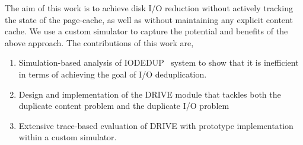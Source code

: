 The aim of this work is to achieve disk I/O reduction without actively 
tracking the state of the page-cache, as well as without maintaining any 
explicit content cache. 
We use a custom simulator to capture
the potential and benefits of the above approach.
The contributions of this work are, 
\begin{enumerate}
\item Simulation-based analysis of IODEDUP~\cite{iodedup} 
	system to show that it is 
	inefficient in terms of achieving the goal of I/O deduplication.
  \item Design and implementation of the DRIVE 
	module that tackles both the
	duplicate content problem and the duplicate I/O problem
\item Extensive trace-based evaluation of DRIVE with prototype
	implementation within a custom simulator.
\end{enumerate}



